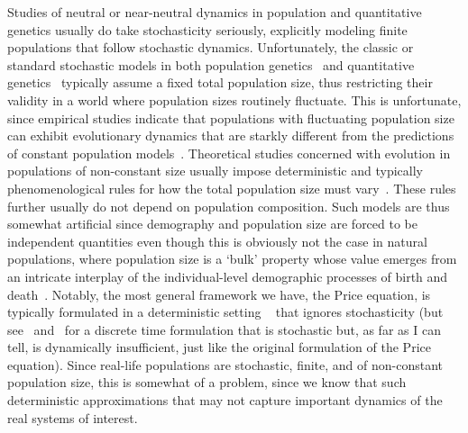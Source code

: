Studies of neutral or near-neutral dynamics in population and quantitative genetics usually do take stochasticity seriously, explicitly modeling finite populations that follow stochastic dynamics. Unfortunately, the classic or standard stochastic models in both population genetics~\citep{fisher_genetical_1930,wright_evolution_1931, moran_random_1958, kimura_diffusion_1964} and quantitative genetics~\citep{crow_introduction_1970, lande_natural_1976} typically assume a fixed total population size, thus restricting their validity in a world where population sizes routinely fluctuate. This is unfortunate, since empirical studies indicate that populations with fluctuating population size can exhibit evolutionary dynamics that are starkly different from the predictions of constant population models~\citep{sanchez_feedback_2013,chavhan_larger_2019,chavhan_interplay_2021}. Theoretical studies concerned with evolution in populations of non-constant size usually impose deterministic and typically phenomenological rules for how the total population size must vary~\citep{kimura_probability_1974,ewens_probability_1967,otto_probability_1997, engen_fixation_2009, waxman_unified_2011}. These rules further usually do not depend on population composition. Such models are thus somewhat artificial since demography and population size are forced to be independent quantities even though this is obviously not the case in natural populations, where population size is a `bulk' property whose value emerges from an intricate interplay of the individual-level demographic processes of birth and death~\citep{metcalf_why_2007,doebeli_towards_2017}. Notably, the most general framework we have, the Price equation, is typically formulated in a deterministic setting ~\citep{page_unifying_2002,frank_natural_2012,queller_fundamental_2017,lion_theoretical_2018,day_price_2020} that ignores stochasticity (but see~\citet{rice_stochastic_2008} and~\citet{rice_universal_2020} for a discrete time formulation that is stochastic but, as far as I can tell, is dynamically insufficient, just like the original formulation of the Price equation). Since real-life populations are stochastic, finite, and of non-constant population size, this is somewhat of a problem, since we know that such deterministic approximations that may not capture important dynamics of the real systems of interest.

